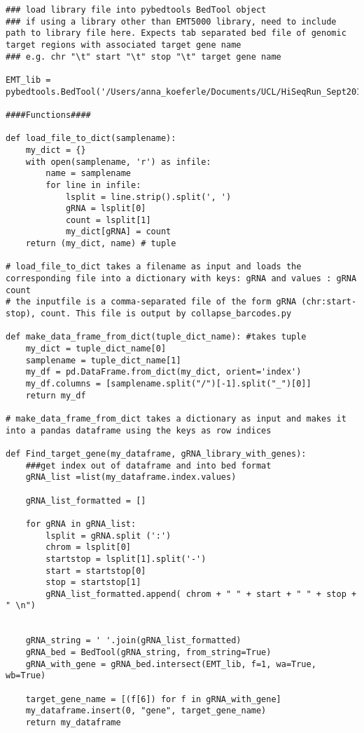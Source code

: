 \begin{footnotesize}
\begin{lstlisting}
### load library file into pybedtools BedTool object
### if using a library other than EMT5000 library, need to include path to library file here. Expects tab separated bed file of genomic target regions with associated target gene name
### e.g. chr "\t" start "\t" stop "\t" target gene name

EMT_lib = pybedtools.BedTool('/Users/anna_koeferle/Documents/UCL/HiSeqRun_Sept2015/gRNA_counts/EMT5000_library_regions.bed')

####Functions####

def load_file_to_dict(samplename):
    my_dict = {}
    with open(samplename, 'r') as infile:
        name = samplename
        for line in infile:
            lsplit = line.strip().split(', ')
            gRNA = lsplit[0]
            count = lsplit[1]
            my_dict[gRNA] = count
    return (my_dict, name) # tuple

# load_file_to_dict takes a filename as input and loads the corresponding file into a dictionary with keys: gRNA and values : gRNA count
# the inputfile is a comma-separated file of the form gRNA (chr:start-stop), count. This file is output by collapse_barcodes.py

def make_data_frame_from_dict(tuple_dict_name): #takes tuple
    my_dict = tuple_dict_name[0]
    samplename = tuple_dict_name[1]
    my_df = pd.DataFrame.from_dict(my_dict, orient='index')
    my_df.columns = [samplename.split("/")[-1].split("_")[0]]
    return my_df

# make_data_frame_from_dict takes a dictionary as input and makes it into a pandas dataframe using the keys as row indices

def Find_target_gene(my_dataframe, gRNA_library_with_genes):
    ###get index out of dataframe and into bed format
    gRNA_list =list(my_dataframe.index.values)

    gRNA_list_formatted = []

    for gRNA in gRNA_list:
        lsplit = gRNA.split (':')
        chrom = lsplit[0]
        startstop = lsplit[1].split('-')
        start = startstop[0]
        stop = startstop[1]
        gRNA_list_formatted.append( chrom + " " + start + " " + stop + " \n")


    gRNA_string = ' '.join(gRNA_list_formatted)
    gRNA_bed = BedTool(gRNA_string, from_string=True)
    gRNA_with_gene = gRNA_bed.intersect(EMT_lib, f=1, wa=True, wb=True)

    target_gene_name = [(f[6]) for f in gRNA_with_gene]
    my_dataframe.insert(0, "gene", target_gene_name)
    return my_dataframe



\end{lstlisting}
\end{footnotesize}
